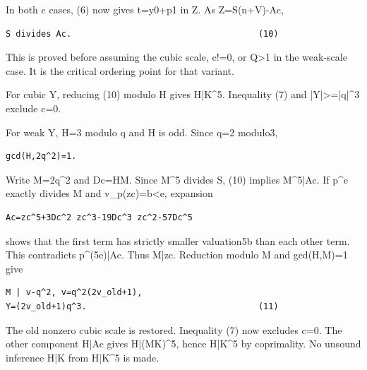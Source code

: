 In both c cases, (6) now gives t=\allowbreak{}y0+\allowbreak{}p1 in Z. As Z=\allowbreak{}S(n+\allowbreak{}V)-Ac,



\begin{verbatim}
S divides Ac.                                     (10)
\end{verbatim}

This is proved before assuming the cubic scale, c!=\allowbreak{}0, or Q\textgreater{}\allowbreak{}1 in the weak-scale case. It is the critical ordering point for that variant.



For cubic Y, reducing (10) modulo H gives H|K\textasciicircum{}\allowbreak{}5. Inequality (7) and |Y|\textgreater{}\allowbreak{}=\allowbreak{}|q|\textasciicircum{}\allowbreak{}3 exclude c=\allowbreak{}0.



For weak Y, H=\allowbreak{}3 modulo q and H is odd. Since q=\allowbreak{}2 modulo3,



\begin{verbatim}
gcd(H,2q^2)=1.
\end{verbatim}

Write M=\allowbreak{}2q\textasciicircum{}\allowbreak{}2 and Dc=\allowbreak{}HM. Since M\textasciicircum{}\allowbreak{}5 divides S, (10) implies M\textasciicircum{}\allowbreak{}5|Ac. If p\textasciicircum{}\allowbreak{}e exactly divides M and v\_\allowbreak{}p(zc)=\allowbreak{}b\textless{}\allowbreak{}e, expansion



\begin{verbatim}
Ac=zc^5+3Dc^2 zc^3-19Dc^3 zc^2-57Dc^5
\end{verbatim}

shows that the first term has strictly smaller valuation5b than each other term. This contradicts p\textasciicircum{}\allowbreak{}(5e)|Ac. Thus M|zc. Reduction modulo M and gcd(H,M)=\allowbreak{}1 give



\begin{verbatim}
M | v-q^2, v=q^2(2v_old+1),
Y=(2v_old+1)q^3.                                  (11)
\end{verbatim}

The old nonzero cubic scale is restored. Inequality (7) now excludes c=\allowbreak{}0. The other component H|Ac gives H|(MK)\textasciicircum{}\allowbreak{}5, hence H|K\textasciicircum{}\allowbreak{}5 by coprimality. No unsound inference H|K from H|K\textasciicircum{}\allowbreak{}5 is made.




